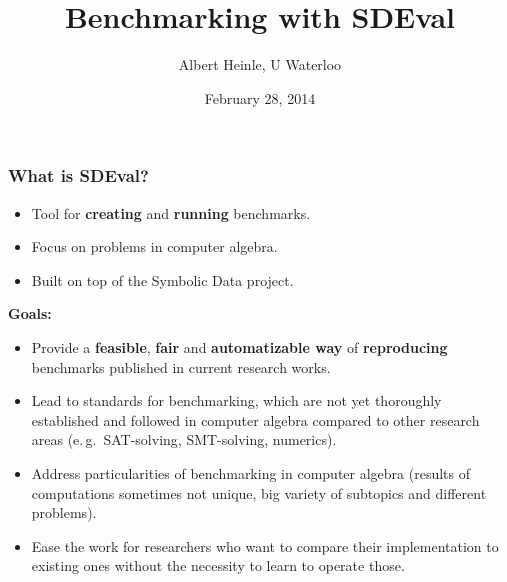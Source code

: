 \documentclass{beamer}
\author{Albert Heinle, U Waterloo}
\title{Benchmarking with SDEval}
\date{February 28, 2014}
\begin{document}
\begin{frame}
\begin{titlepage}
\end{titlepage}
\end{frame}
\begin{frame}
  \frametitle{What is SDEval?}
  
  \begin{itemize}
    \item Tool for {\textbf{creating}} and {\textbf{running}} benchmarks.
    \item Focus on problems in computer algebra.
    \item Built on top of the Symbolic Data project.
  \end{itemize}
  {\textbf{Goals:}}
  \begin{itemize}
    \item Provide a {\textbf{feasible}}, {\textbf{fair}} and
      {\textbf{automatizable way}} of {\textbf{reproducing}} benchmarks
      published in current research works.
    \item Lead to standards for benchmarking, which are not yet thoroughly
      established and followed in computer algebra compared to other research
      areas (e.\,g.\ SAT-solving, SMT-solving, numerics).
    \item Address particularities of benchmarking in computer algebra (results
      of computations sometimes not unique, big variety of subtopics and
      different problems).
    \item Ease the work for researchers who want to compare their
      implementation to existing ones without the necessity to learn to
      operate those.
  \end{itemize}
\end{frame}
\end{document}
